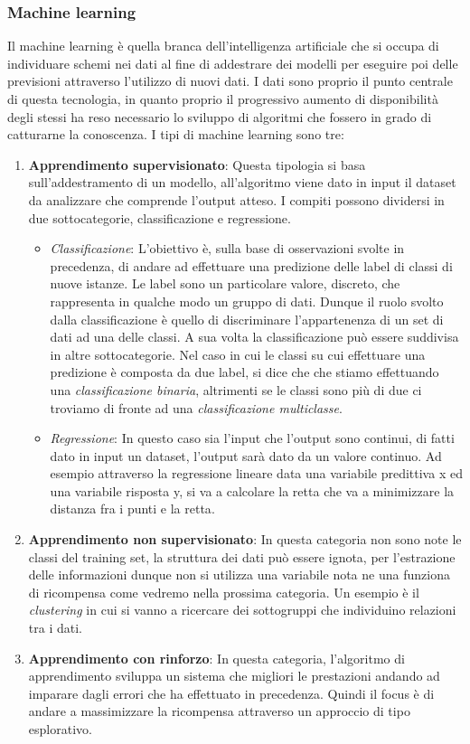 \subsubsection{Machine learning}
\label{subsub:ml}
Il machine learning è quella branca dell'intelligenza artificiale che si occupa di individuare schemi nei dati al fine di addestrare dei modelli per eseguire poi delle previsioni attraverso l'utilizzo di nuovi dati. I dati sono proprio il punto centrale di questa tecnologia, in quanto proprio il progressivo aumento di disponibilità degli stessi ha reso necessario lo sviluppo di algoritmi che fossero in grado di catturarne la conoscenza. I tipi di machine learning sono tre: 
\begin{enumerate}
    \item \textbf{Apprendimento supervisionato}: Questa tipologia si basa sull'addestramento di un modello, all'algoritmo viene dato in input il dataset da analizzare che comprende l'output atteso. I compiti possono dividersi in due sottocategorie, classificazione e regressione. 
    \begin{itemize}
        \item \textit{Classificazione}: L'obiettivo è, sulla base di osservazioni svolte in precedenza, di andare ad effettuare una predizione delle label di classi di nuove istanze. Le label sono un particolare valore, discreto, che rappresenta in qualche modo un gruppo di dati. Dunque il ruolo svolto dalla classificazione è quello di discriminare l'appartenenza di un set di dati ad una delle classi. A sua volta la classificazione può essere suddivisa in altre sottocategorie. Nel caso in cui le classi su cui effettuare una predizione è composta da due label, si dice che che stiamo effettuando una \textit{classificazione binaria}, altrimenti se le classi sono più di due ci troviamo di fronte ad una \textit{classificazione multiclasse}. 
        
        \item \textit{Regressione}: In questo caso sia l'input che l'output sono continui, di fatti dato in input un dataset, l'output sarà dato da un valore continuo. Ad esempio attraverso la regressione lineare data una variabile predittiva x ed una variabile risposta y, si va a calcolare la retta che va a minimizzare la distanza fra i punti e la retta\cite{pyML}.
    \end{itemize}
    \item \textbf{Apprendimento non supervisionato}: In questa categoria non sono note le classi del training set, la struttura dei dati può essere ignota, per l'estrazione delle informazioni dunque non si utilizza una variabile nota ne una funziona di ricompensa come vedremo nella prossima categoria. Un esempio è il \textit{clustering} in cui si vanno a ricercare dei sottogruppi che individuino relazioni tra i dati. 
    \item \textbf{Apprendimento con rinforzo}: In questa categoria, l'algoritmo di apprendimento sviluppa un sistema che migliori le prestazioni andando ad imparare dagli errori che ha effettuato in precedenza. Quindi il focus è di andare a massimizzare la ricompensa attraverso un approccio di tipo esplorativo. 
    
\end{enumerate}
